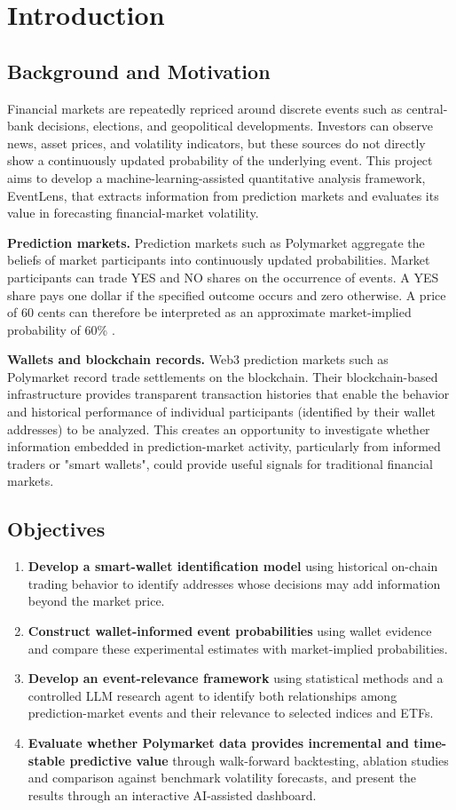 \section{Introduction}
\subsection{Background and Motivation}
Financial markets are repeatedly repriced around discrete events such as central-bank decisions, elections, and geopolitical developments. Investors can observe news, asset prices, and volatility indicators, but these sources do not directly show a continuously updated probability of the underlying event. This project aims to develop a machine-learning-assisted quantitative analysis framework, EventLens, that extracts information from prediction markets and evaluates its value in forecasting financial-market volatility.

\textbf{Prediction markets.} Prediction markets such as Polymarket aggregate the beliefs of market participants into continuously updated probabilities. Market participants can trade YES and NO shares on the occurrence of events. A YES share pays one dollar if the specified outcome occurs and zero otherwise. A price of 60 cents can therefore be interpreted as an approximate market-implied probability of 60\% \cite{wolfers2004,wolfers2006}.

\textbf{Wallets and blockchain records.} Web3 prediction markets such as Polymarket record trade settlements on the blockchain. Their blockchain-based infrastructure provides transparent transaction histories that enable the behavior and historical performance of individual participants (identified by their wallet addresses) to be analyzed. This creates an opportunity to investigate whether information embedded in prediction-market activity, particularly from informed traders or "smart wallets", could provide useful signals for traditional financial markets.

\subsection{Objectives}
\begin{enumerate}
\item \textbf{Develop a smart-wallet identification model} using historical on-chain trading behavior to identify addresses whose decisions may add information beyond the market price.
\item \textbf{Construct wallet-informed event probabilities} using wallet evidence and compare these experimental estimates with market-implied probabilities.
\item \textbf{Develop an event-relevance framework} using statistical methods and a controlled LLM research agent to identify both relationships among prediction-market events and their relevance to selected indices and ETFs.
\item \textbf{Evaluate whether Polymarket data provides incremental and time-stable predictive value} through walk-forward backtesting, ablation studies and comparison against benchmark volatility forecasts, and present the results through an interactive AI-assisted dashboard.
\end{enumerate}


